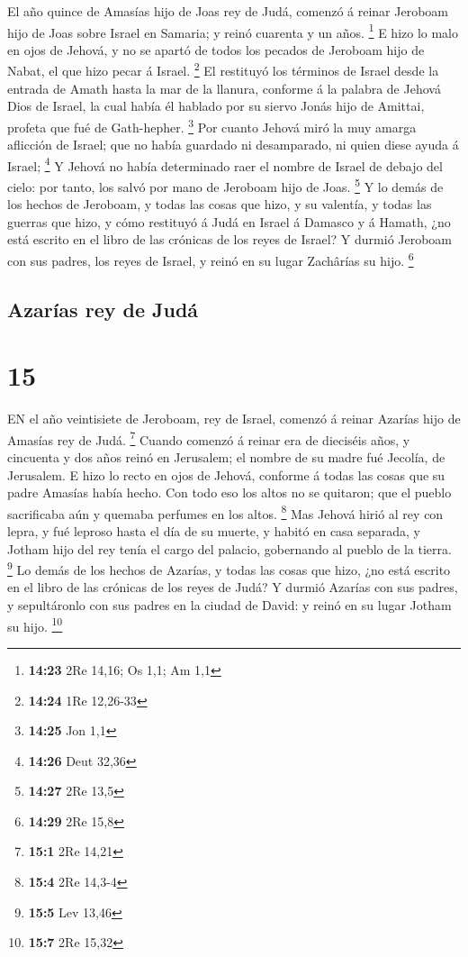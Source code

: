  El año quince de Amasías hijo de Joas rey de Judá, comenzó
á reinar Jeroboam hijo de Joas sobre Israel en Samaria; y reinó cuarenta
y un años. \footnote{\textbf{14:23} 2Re 14,16; Os 1,1; Am 1,1}
 E hizo lo malo en ojos de Jehová, y no se apartó de todos
los pecados de Jeroboam hijo de Nabat, el que hizo pecar á Israel.
\footnote{\textbf{14:24} 1Re 12,26-33}  El restituyó los
términos de Israel desde la entrada de Amath hasta la mar de la llanura,
conforme á la palabra de Jehová Dios de Israel, la cual había él hablado
por su siervo Jonás hijo de Amittai, profeta que fué de Gath-hepher.
\footnote{\textbf{14:25} Jon 1,1}  Por cuanto Jehová miró
la muy amarga aflicción de Israel; que no había guardado ni desamparado,
ni quien diese ayuda á Israel; \footnote{\textbf{14:26} Deut 32,36}
 Y Jehová no había determinado raer el nombre de Israel de
debajo del cielo: por tanto, los salvó por mano de Jeroboam hijo de
Joas. \footnote{\textbf{14:27} 2Re 13,5}  Y lo demás de los
hechos de Jeroboam, y todas las cosas que hizo, y su valentía, y todas
las guerras que hizo, y cómo restituyó á Judá en Israel á Damasco y á
Hamath, ¿no está escrito en el libro de las crónicas de los reyes de
Israel?  Y durmió Jeroboam con sus padres, los reyes de
Israel, y reinó en su lugar Zachârías su hijo. \footnote{\textbf{14:29}
  2Re 15,8}

\hypertarget{azaruxedas-rey-de-juduxe1}{%
\subsection{Azarías rey de Judá}\label{azaruxedas-rey-de-juduxe1}}

\hypertarget{section-14}{%
\section{15}\label{section-14}}

 EN el año veintisiete de Jeroboam, rey de Israel, comenzó á
reinar Azarías hijo de Amasías rey de Judá. \footnote{\textbf{15:1} 2Re
  14,21}  Cuando comenzó á reinar era de dieciséis años, y
cincuenta y dos años reinó en Jerusalem; el nombre de su madre fué
Jecolía, de Jerusalem.  E hizo lo recto en ojos de Jehová,
conforme á todas las cosas que su padre Amasías había hecho.
 Con todo eso los altos no se quitaron; que el pueblo
sacrificaba aún y quemaba perfumes en los altos. \footnote{\textbf{15:4}
  2Re 14,3-4}  Mas Jehová hirió al rey con lepra, y fué
leproso hasta el día de su muerte, y habitó en casa separada, y Jotham
hijo del rey tenía el cargo del palacio, gobernando al pueblo de la
tierra. \footnote{\textbf{15:5} Lev 13,46}  Lo demás de los
hechos de Azarías, y todas las cosas que hizo, ¿no está escrito en el
libro de las crónicas de los reyes de Judá?  Y durmió
Azarías con sus padres, y sepultáronlo con sus padres en la ciudad de
David: y reinó en su lugar Jotham su hijo. \footnote{\textbf{15:7} 2Re
  15,32}

